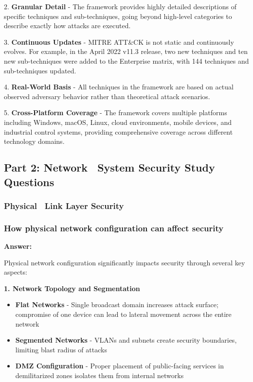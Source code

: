 \documentclass[12pt,a4paper]{article}
\begin{document}
2. \textbf{Granular Detail} - The framework provides highly detailed descriptions of specific techniques and sub-techniques, going beyond high-level categories to describe exactly how attacks are executed.

3. \textbf{Continuous Updates} - MITRE ATT\&CK is not static and continuously evolves. For example, in the April 2022 v11.3 release, two new techniques and ten new sub-techniques were added to the Enterprise matrix, with 144 techniques and sub-techniques updated. 

4. \textbf{Real-World Basis} - All techniques in the framework are based on actual observed adversary behavior rather than theoretical attack scenarios.

5. \textbf{Cross-Platform Coverage} - The framework covers multiple platforms including Windows, macOS, Linux, cloud environments, mobile devices, and industrial control systems, providing comprehensive coverage across different technology domains.

\subsection{Part 2: Network \ System Security Study Questions}

\subsubsection{Physical \ Link Layer Security}

\subsubsection{How physical network configuration can affect security}

\textbf{Answer:}

Physical network configuration significantly impacts security through several key aspects:

\textbf{1. Network Topology and Segmentation}
\begin{itemize}
    \item \textbf{Flat Networks} - Single broadcast domain increases attack surface; compromise of one device can lead to lateral movement across the entire network
    \item \textbf{Segmented Networks} - VLANs and subnets create security boundaries, limiting blast radius of attacks
    \item \textbf{DMZ Configuration} - Proper placement of public-facing services in demilitarized zones isolates them from internal networks
\end{itemize}
\end{document}
